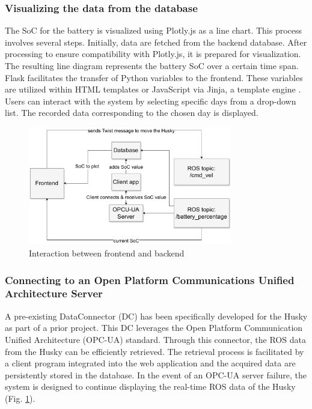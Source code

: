 \documentclass[conference]{IEEEtran}
\begin{document}
\subsubsection{Visualizing the data from the database}
The SoC for the battery is visualized using Plotly.js as a line chart. This process involves several steps. Initially, data are fetched from the backend database. After processing to ensure compatibility with Plotly.js, it is prepared for visualization. The resulting line diagram represents the battery SoC over a certain time span. Flask facilitates the transfer of Python variables to the frontend. 
These variables are utilized within HTML templates or JavaScript via Jinja, a template engine \cite{jinja}. Users can interact with the system by selecting specific days from a drop-down list. The recorded data corresponding to the chosen day is displayed.
\begin{figure}[tp]
    \centerline{\includegraphics[width=8.9cm]{Pictures/backfrontbig.pdf}}
    \caption{Interaction between frontend and backend}
    \label{fig:backfront}
\end{figure}
\subsubsection{Connecting to an Open Platform Communications Unified Architecture Server}
A pre-existing DataConnector (DC) has been specifically developed for the Husky as part of a prior project. This DC leverages the Open Platform Communication Unified Architecture \cite{opcua} (OPC-UA) standard. Through this connector, the ROS data from the Husky can be efficiently retrieved. The retrieval process is facilitated by a client program integrated into the web application and the acquired data are persistently stored in the database. 
In the event of an OPC-UA server failure, the system is designed to continue displaying the real-time ROS data of the Husky (Fig. \ref{fig:backfront}).
\end{document}
